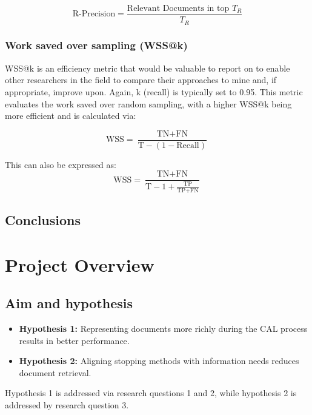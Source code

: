 \documentclass[10pt,oneside]{book}
\begin{document}
\begin{equation}
\text{R-Precision} = \frac{\text{Relevant Documents in top } T_R}{T_R}
\end{equation}
\subsection{Work saved over sampling (WSS@k)}

WSS@k is an efficiency metric that would be valuable to report on to enable other researchers in the field to compare their approaches to mine and, if appropriate, improve upon. Again, k (recall) is typically set to 0.95. This metric evaluates the work saved over random sampling, with a higher WSS@k being more efficient and is calculated via:


\begin{equation}
\text{WSS} = \frac{\text{TN} + \text{FN}}{\text{T} - (1 - \text{Recall})}
\end{equation}

This can also be expressed as:
\begin{equation}
\text{WSS} = \frac{\text{TN} + \text{FN}}{\text{T} - 1 + \frac{\text{TP}}{\text{TP} + \text{FN}}}
\end{equation}

\section{Conclusions}


\chapter{Project Overview}

\section{Aim and hypothesis}

\begin{itemize}
    \item \textbf{Hypothesis 1:} Representing documents more richly during the CAL process results in better performance.
    \item \textbf{Hypothesis 2:} Aligning stopping methods with information needs reduces document retrieval.
\end{itemize}

Hypothesis 1 is addressed via research questions 1 and 2, while hypothesis 2 is addressed by research question 3.
\end{document}
